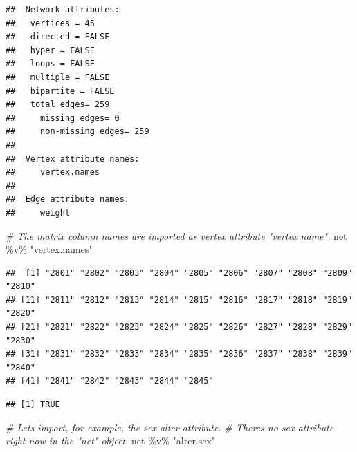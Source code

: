 \documentclass[
]{book}
\newenvironment{Shaded}{\begin{snugshade}}{\end{snugshade}}
\newcommand{\CommentTok}[1]{\textcolor[rgb]{0.56,0.35,0.01}{\textit{#1}}}
\newcommand{\FloatTok}[1]{\textcolor[rgb]{0.00,0.00,0.81}{#1}}
\newcommand{\FunctionTok}[1]{\textcolor[rgb]{0.00,0.00,0.00}{#1}}
\newcommand{\NormalTok}[1]{#1}
\newcommand{\OtherTok}[1]{\textcolor[rgb]{0.56,0.35,0.01}{#1}}
\newcommand{\SpecialCharTok}[1]{\textcolor[rgb]{0.00,0.00,0.00}{#1}}
\newcommand{\StringTok}[1]{\textcolor[rgb]{0.31,0.60,0.02}{#1}}
\begin{document}
\begin{verbatim}
##  Network attributes:
##   vertices = 45 
##   directed = FALSE 
##   hyper = FALSE 
##   loops = FALSE 
##   multiple = FALSE 
##   bipartite = FALSE 
##   total edges= 259 
##     missing edges= 0 
##     non-missing edges= 259 
## 
##  Vertex attribute names: 
##     vertex.names 
## 
##  Edge attribute names: 
##     weight
\end{verbatim}

\begin{Shaded}
\begin{Highlighting}[]
\CommentTok{\# The matrix column names are imported as vertex attribute "vertex name".}
\NormalTok{net }\SpecialCharTok{\%v\%} \StringTok{"vertex.names"}
\end{Highlighting}
\end{Shaded}

\begin{verbatim}
##  [1] "2801" "2802" "2803" "2804" "2805" "2806" "2807" "2808" "2809" "2810"
## [11] "2811" "2812" "2813" "2814" "2815" "2816" "2817" "2818" "2819" "2820"
## [21] "2821" "2822" "2823" "2824" "2825" "2826" "2827" "2828" "2829" "2830"
## [31] "2831" "2832" "2833" "2834" "2835" "2836" "2837" "2838" "2839" "2840"
## [41] "2841" "2842" "2843" "2844" "2845"
\end{verbatim}

\begin{Shaded}
\end{Shaded}

\begin{verbatim}
## [1] TRUE
\end{verbatim}

\begin{Shaded}
\begin{Highlighting}[]
\CommentTok{\# Let\textquotesingle{}s import, for example, the sex alter attribute.}
\CommentTok{\# There\textquotesingle{}s no sex attribute right now in the "net" object.}
\NormalTok{net }\SpecialCharTok{\%v\%} \StringTok{"alter.sex"}
\end{Highlighting}
\end{Shaded}
\end{document}
